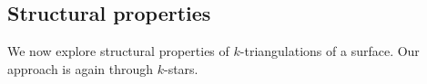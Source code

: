 \documentclass{amsart}
\newtheorem{proposition}[theorem]{Proposition}
\newtheorem{definition}[theorem]{Definition}
\theoremstyle{remark}
\newtheorem{example}[theorem]{Example}
\newcommand{\darkblue}{\color{darkblue}} %
\newcommand{\defn}[1]{\textsl{\darkblue #1}} %
\newcommand{\eqdef}{\mbox{\,\raisebox{0.2ex}{\scriptsize\ensuremath{\mathrm:}}\ensuremath{=}\,}} %
\newcommand*{\ef}[0]{E-finite\xspace}
\newcommand{\surface}{\mathcal{S}}
\newcommand{\vincent}[1]{\todo[color=blue!30]{#1 \\ \hfill --- V.}}
\begin{document}
%
%
%
%
%
%
%



\newpage
\subsection{Structural properties}

We now explore structural properties of $k$-triangulations of a surface.
Our approach is again through $k$-stars.


\end{document}
